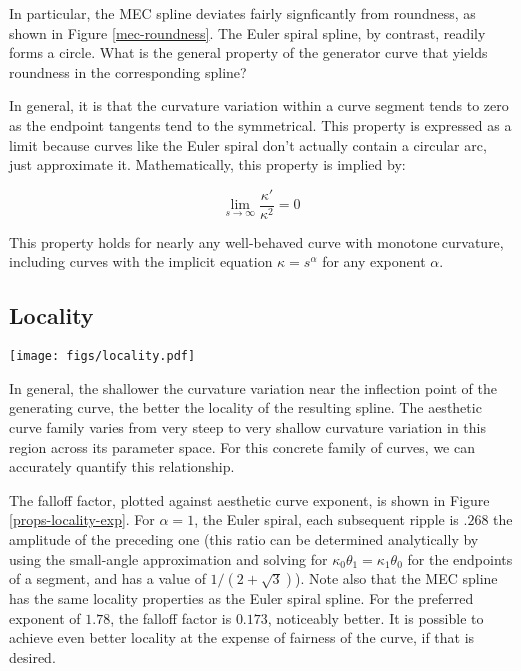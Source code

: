 \documentclass{article}
\begin{document}
In particular, the MEC spline deviates fairly signficantly from
roundness, as shown in Figure \ref{mec-roundness}. The Euler spiral
spline, by contrast, readily forms a circle. What is the general
property of the generator curve that yields roundness in the
corresponding spline?

In general, it is that the curvature variation within a curve segment
tends to zero as the endpoint tangents tend to the symmetrical. This
property is expressed as a limit because curves like the Euler spiral
don't actually contain a circular arc, just approximate
it. Mathematically, this property is implied by:

\[
\lim_{s \rightarrow \infty} \frac{\kappa'}{\kappa^2} = 0
\]

This property holds for nearly any well-behaved curve with monotone
curvature, including curves with the implicit equation
$\kappa=s^\alpha$ for any exponent $\alpha$.

\subsection{Locality}
\label{locality-subsec}

\begin{figure*}[tbh]
\begin{center}
\texttt{[image: figs/locality.pdf]}
\caption{\label{props-locality-exp}Locality improves as exponent increases.}
\end{center}
\end{figure*}

In general, the shallower the curvature variation near the inflection
point of the generating curve, the better the locality of the
resulting spline. The aesthetic curve family varies from very steep to
very shallow curvature variation in this region across its parameter
space. For this concrete family of curves, we can accurately quantify
this relationship.

The falloff factor, plotted against aesthetic curve exponent, is shown
in Figure \ref{props-locality-exp}. For $\alpha = 1$, the Euler
spiral, each subsequent ripple is $.268$ the amplitude of the
preceding one (this ratio can be determined analytically by using the
small-angle approximation and solving for $\kappa_0\theta_1 =
\kappa_1\theta_0$ for the endpoints of a segment, and has a value of
$1/(2 + \sqrt{3})$). Note also that the MEC spline has the same
locality properties as the Euler spiral spline. For the preferred
exponent of $1.78$, the falloff factor is $0.173$, noticeably
better. It is possible to achieve even better locality at the expense
of fairness of the curve, if that is desired.
\end{document}
